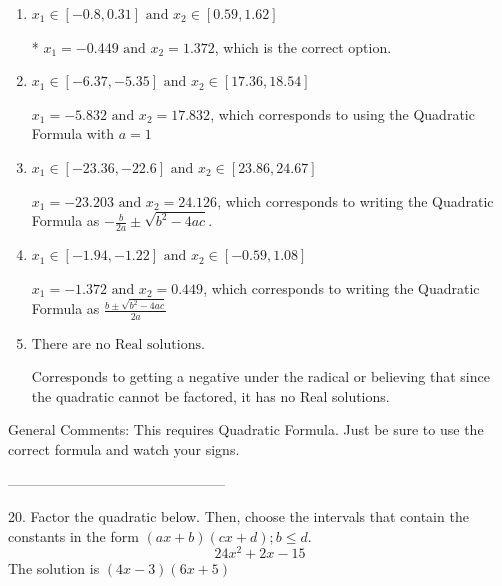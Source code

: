 \documentclass{extbook}[14pt]
\begin{document}
\begin{enumerate}[label=\Alph*.] 
\item $ x_1 \in [-0.8, 0.31] \text{ and } x_2 \in [0.59, 1.62] $ 

 * $x_1 = -0.449 \text{ and } x_2 = 1.372$, which is the correct option. 
\item $ x_1 \in [-6.37, -5.35] \text{ and } x_2 \in [17.36, 18.54] $ 

  $x_1 = -5.832 \text{ and } x_2 = 17.832$, which corresponds to using the Quadratic Formula with $a=1$ 
\item $ x_1 \in [-23.36, -22.6] \text{ and } x_2 \in [23.86, 24.67] $ 

  $x_1 = -23.203 \text{ and } x_2 = 24.126$, which corresponds to writing the Quadratic Formula as $-\frac{b}{2a} \pm \sqrt{b^2 - 4ac}$. 
\item $ x_1 \in [-1.94, -1.22] \text{ and } x_2 \in [-0.59, 1.08] $ 

  $x_1 = -1.372 \text{ and } x_2 = 0.449$, which corresponds to writing the Quadratic Formula as $\frac{b \pm \sqrt{b^2 - 4ac}}{2a}$ 
\item $ \text{There are no Real solutions.} $ 

 Corresponds to getting a negative under the radical or believing that since the quadratic cannot be factored, it has no Real solutions. 
\end{enumerate} 
 
General Comments: This requires Quadratic Formula. Just be sure to use the correct formula and watch your signs.

-----------------------------------------------

20. Factor the quadratic below. Then, choose the intervals that contain the constants in the form $(ax+b)(cx+d); b \leq d.$
\[ 24x^{2} +2 x -15 \] 
The solution is $ (4x -3)(6x + 5) $ 
\end{document}
